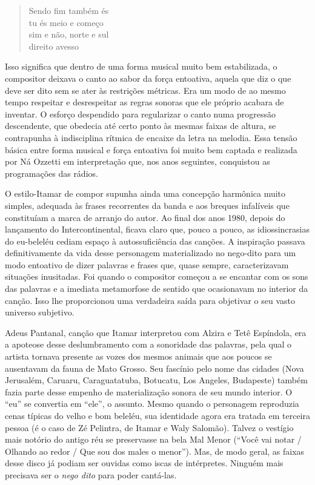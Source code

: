 \begin{verse}
Sendo fim também és\\
tu és meio e começo\\
sim e não, norte e sul\\
direito avesso
\end{verse}

Isso significa que dentro de uma forma musical muito bem estabilizada, o
compositor deixava o canto ao sabor da força entoativa, aquela que diz o
que deve ser dito sem se ater às restrições métricas. Era um modo de ao
mesmo tempo respeitar e desrespeitar as regras sonoras que ele próprio
acabara de inventar. O esforço despendido para regularizar o canto numa
progressão descendente, que obedecia até certo ponto às mesmas faixas de
altura, se contrapunha à indisciplina rítmica de encaixe da letra na
melodia. Essa tensão básica entre forma musical e força entoativa foi
muito bem captada e realizada por Ná Ozzetti em interpretação que, nos
anos seguintes, conquistou as programações das rádios.

O estilo-Itamar de compor supunha ainda uma concepção harmônica muito
simples, adequada às frases recorrentes da banda e aos breques
infalíveis que constituíam a marca de arranjo do autor. Ao final dos
anos 1980, depois do lançamento do Intercontinental, ficava claro que,
pouco a pouco, as idiossincrasias do eu-beleléu cediam espaço à
autossuficiência das canções. A inspiração passava definitivamente da
vida desse personagem materializado no nego-dito para um modo entoativo
de dizer palavras e frases que, quase sempre, caracterizavam situações
inusitadas. Foi quando o compositor começou a se encantar com os sons
das palavras e a imediata metamorfose de sentido que ocasionavam no
interior da canção. Isso lhe proporcionou uma verdadeira saída para
objetivar o seu vasto universo subjetivo.

Adeus Pantanal, canção que Itamar interpretou com Alzira e Tetê
Espíndola, era a apoteose desse deslumbramento com a sonoridade das
palavras, pela qual o artista tornava presente as vozes dos mesmos
animais que aos poucos se ausentavam da fauna de Mato Grosso. Seu
fascínio pelo nome das cidades (Nova Jerusalém, Caruaru, Caraguatatuba,
Botucatu, Los Angeles, Budapeste) também fazia parte desse empenho de
materialização sonora de seu mundo interior. O ``eu'' se convertia em
``ele'', o assunto. Mesmo quando o personagem reproduzia cenas típicas
do velho e bom beleléu, sua identidade agora era tratada em terceira
pessoa (é o caso de Zé Pelintra, de Itamar e Waly Salomão). Talvez o
vestígio mais notório do antigo réu se preservasse na bela Mal Menor
(``Você vai notar / Olhando ao redor / Que sou dos males o menor'').
Mas, de modo geral, as faixas desse disco já podiam ser ouvidas como
iscas de intérpretes. Ninguém mais precisava ser o \textit{nego dito} para poder
cantá-las.


